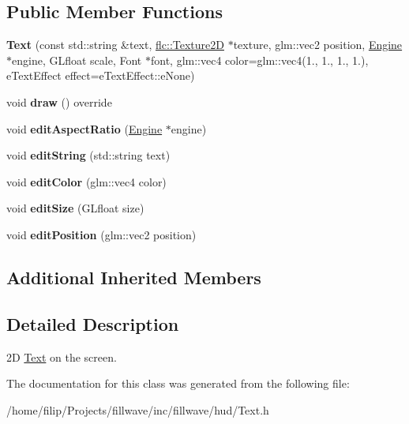 \subsection*{Public Member Functions}
\begin{DoxyCompactItemize}
\item 
{\bfseries Text} (const std\+::string \&text, \hyperlink{classflw_1_1flc_1_1Texture2D}{flc\+::\+Texture2D} $\ast$texture, glm\+::vec2 position, \hyperlink{classflw_1_1Engine}{Engine} $\ast$engine, G\+Lfloat scale, Font $\ast$font, glm\+::vec4 color=glm\+::vec4(1., 1., 1., 1.), e\+Text\+Effect effect=e\+Text\+Effect\+::e\+None)\hypertarget{classflw_1_1flf_1_1Text_a8695b0986190e44694d388e567045fef}{}\label{classflw_1_1flf_1_1Text_a8695b0986190e44694d388e567045fef}

\item 
void {\bfseries draw} () override\hypertarget{classflw_1_1flf_1_1Text_a5860fbb726f7b4d54e3a04c04199950d}{}\label{classflw_1_1flf_1_1Text_a5860fbb726f7b4d54e3a04c04199950d}

\item 
void {\bfseries edit\+Aspect\+Ratio} (\hyperlink{classflw_1_1Engine}{Engine} $\ast$engine)\hypertarget{classflw_1_1flf_1_1Text_a02884e95bd7ada642bd6d01449852b4a}{}\label{classflw_1_1flf_1_1Text_a02884e95bd7ada642bd6d01449852b4a}

\item 
void {\bfseries edit\+String} (std\+::string text)\hypertarget{classflw_1_1flf_1_1Text_ae14a3938af5dba9ab65bc0df2ce2505e}{}\label{classflw_1_1flf_1_1Text_ae14a3938af5dba9ab65bc0df2ce2505e}

\item 
void {\bfseries edit\+Color} (glm\+::vec4 color)\hypertarget{classflw_1_1flf_1_1Text_ad6c8bcb7787f6605135c960ffda69f8a}{}\label{classflw_1_1flf_1_1Text_ad6c8bcb7787f6605135c960ffda69f8a}

\item 
void {\bfseries edit\+Size} (G\+Lfloat size)\hypertarget{classflw_1_1flf_1_1Text_a6e1aedb4fd4197ee69c40f24c3e61d69}{}\label{classflw_1_1flf_1_1Text_a6e1aedb4fd4197ee69c40f24c3e61d69}

\item 
void {\bfseries edit\+Position} (glm\+::vec2 position)\hypertarget{classflw_1_1flf_1_1Text_a1b245a409e1f177182f7cb1fd4313315}{}\label{classflw_1_1flf_1_1Text_a1b245a409e1f177182f7cb1fd4313315}

\end{DoxyCompactItemize}
\subsection*{Additional Inherited Members}


\subsection{Detailed Description}
2D \hyperlink{classflw_1_1flf_1_1Text}{Text} on the screen. 

The documentation for this class was generated from the following file\+:\begin{DoxyCompactItemize}
\item 
/home/filip/\+Projects/fillwave/inc/fillwave/hud/Text.\+h\end{DoxyCompactItemize}
